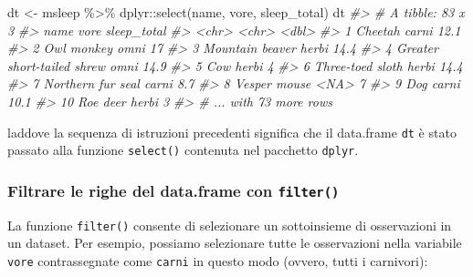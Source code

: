 \documentclass[
]{memoir}
\newenvironment{Shaded}{\begin{snugshade}}{\end{snugshade}}
\newcommand{\CommentTok}[1]{\textcolor[rgb]{0.56,0.35,0.01}{\textit{#1}}}
\newcommand{\FunctionTok}[1]{\textcolor[rgb]{0.00,0.00,0.00}{#1}}
\newcommand{\NormalTok}[1]{#1}
\newcommand{\OtherTok}[1]{\textcolor[rgb]{0.56,0.35,0.01}{#1}}
\newcommand{\SpecialCharTok}[1]{\textcolor[rgb]{0.00,0.00,0.00}{#1}}
\theoremstyle{definition}
\theoremstyle{definition}
\theoremstyle{definition}
\theoremstyle{definition}
\theoremstyle{remark}
\begin{document}
\begin{Shaded}
\begin{Highlighting}[]
\NormalTok{dt }\OtherTok{\textless{}{-}}\NormalTok{ msleep }\SpecialCharTok{\%\textgreater{}\%}
\NormalTok{  dplyr}\SpecialCharTok{::}\FunctionTok{select}\NormalTok{(name, vore, sleep\_total)}
\NormalTok{dt}
\CommentTok{\#\textgreater{} \# A tibble: 83 x 3}
\CommentTok{\#\textgreater{}    name                       vore  sleep\_total}
\CommentTok{\#\textgreater{}    \textless{}chr\textgreater{}                      \textless{}chr\textgreater{}       \textless{}dbl\textgreater{}}
\CommentTok{\#\textgreater{}  1 Cheetah                    carni        12.1}
\CommentTok{\#\textgreater{}  2 Owl monkey                 omni         17  }
\CommentTok{\#\textgreater{}  3 Mountain beaver            herbi        14.4}
\CommentTok{\#\textgreater{}  4 Greater short{-}tailed shrew omni         14.9}
\CommentTok{\#\textgreater{}  5 Cow                        herbi         4  }
\CommentTok{\#\textgreater{}  6 Three{-}toed sloth           herbi        14.4}
\CommentTok{\#\textgreater{}  7 Northern fur seal          carni         8.7}
\CommentTok{\#\textgreater{}  8 Vesper mouse               \textless{}NA\textgreater{}          7  }
\CommentTok{\#\textgreater{}  9 Dog                        carni        10.1}
\CommentTok{\#\textgreater{} 10 Roe deer                   herbi         3  }
\CommentTok{\#\textgreater{} \# ... with 73 more rows}
\end{Highlighting}
\end{Shaded}

laddove la sequenza di istruzioni precedenti significa che il data.frame \texttt{dt} è stato passato alla funzione \texttt{select()} contenuta nel pacchetto \texttt{dplyr}.

\hypertarget{filtrare-le-righe-del-data.frame-con-filter}{%
\subsubsection{\texorpdfstring{Filtrare le righe del data.frame con \texttt{filter()}}{Filtrare le righe del data.frame con filter()}}\label{filtrare-le-righe-del-data.frame-con-filter}}

La funzione \texttt{filter()} consente di selezionare un sottoinsieme di
osservazioni in un dataset. Per esempio, possiamo selezionare tutte le
osservazioni nella variabile \texttt{vore} contrassegnate come \texttt{carni} in
questo modo (ovvero, tutti i carnivori):
\end{document}
